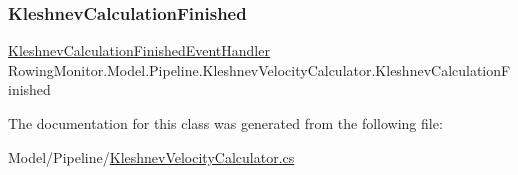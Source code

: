 \subsubsection{\texorpdfstring{Kleshnev\+Calculation\+Finished}{KleshnevCalculationFinished}}
{\footnotesize\ttfamily \hyperlink{class_rowing_monitor_1_1_model_1_1_pipeline_1_1_kleshnev_velocity_calculator_aa8c251dc416d32f364bf138f4abeada7}{Kleshnev\+Calculation\+Finished\+Event\+Handler} Rowing\+Monitor.\+Model.\+Pipeline.\+Kleshnev\+Velocity\+Calculator.\+Kleshnev\+Calculation\+Finished}



The documentation for this class was generated from the following file\+:\begin{DoxyCompactItemize}
\item 
Model/\+Pipeline/\hyperlink{_kleshnev_velocity_calculator_8cs}{Kleshnev\+Velocity\+Calculator.\+cs}\end{DoxyCompactItemize}
